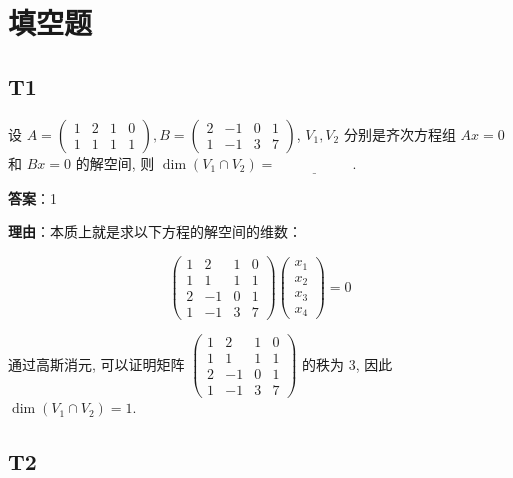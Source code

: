 \documentclass{article}
\begin{document}
\section{填空题}

\subsection{T1}

\par 设 $A=\begin{pmatrix}
	1 & 2 & 1 & 0\\
	1 & 1 & 1 & 1
\end{pmatrix}, B = \begin{pmatrix}
	2 & -1 & 0 & 1\\
	1 & -1 & 3 & 7
\end{pmatrix}$, $V_1, V_2$ 分别是齐次方程组 $Ax=0$ 和 $Bx=0$ 的解空间, 则 $\dim(V_1\cap V_2)=\underline{\phantom{empty\_space}}$.

\par \textbf{答案}：1

\par \textbf{理由}：本质上就是求以下方程的解空间的维数：

\begin{equation*}
	\begin{pmatrix}
		1 & 2 & 1 & 0\\
		1 & 1 & 1 & 1\\
		2 & -1 & 0 & 1\\
		1 & -1 & 3 & 7
	\end{pmatrix} \begin{pmatrix}
		x_1\\x_2\\x_3\\x_4
	\end{pmatrix}=0
\end{equation*}

\par 通过高斯消元, 可以证明矩阵 $\begin{pmatrix}
	1 & 2 & 1 & 0\\
	1 & 1 & 1 & 1\\
	2 & -1 & 0 & 1\\
	1 & -1 & 3 & 7
\end{pmatrix}$ 的秩为 3, 因此 $\dim(V_1\cap V_2)=1$.

\subsection{T2}
\end{document}
